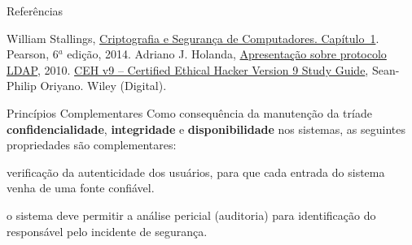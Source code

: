 
\lecturetitle{\course}{\insertlecture}

\frame{\maketitle}

\begin{frame}{Referências}

   \begin{thebibliography}{10}
     \beamertemplatebookbibitems
     William Stallings,
     \newblock   \href{https://feituverava.bv3.digitalpages.com.br/users/publications/9788543005898/pages/5}{Criptografia e Segurança de Computadores. Capítulo~1}.
     \newblock Pearson, 6$^a$ edição, 2014.
     Adriano J. Holanda,
     \newblock  \href{https://speakerdeck.com/ajholanda/ldap}{Apresentação sobre protocolo LDAP}, 2010.
     \href{https://www.eccouncil.org/programs/certified-ethical-hacker-ceh/}{CEH v9 -- Certified Ethical Hacker Version 9 Study Guide},
     \newblock Sean-Philip Oriyano.
     \newblock Wiley (Digital).
   \end{thebibliography}
   
\end{frame}

\begin{frame}{Princípios Complementares}
  Como consequência da manutenção da tríade {\bf confidencialidade},
  {\bf integridade} e {\bf disponibilidade} nos sistemas, as seguintes
  propriedades são complementares:
  
  \begin{description}[<+->]
  \item[Autenticidade:] verificação da autenticidade dos usuários, para que cada 
    entrada do sistema venha de uma fonte confiável.
  \item[Responsabilização:] o sistema deve permitir a análise pericial
    (auditoria) para identificação do responsável pelo incidente de
    segurança.
  \end{description}
\end{frame}

